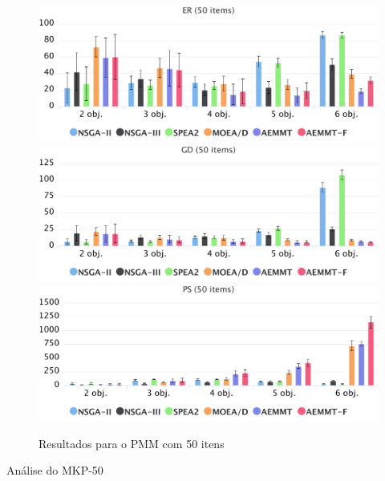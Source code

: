 \begin{figure}[!htbp]
	\caption{Resultados para o PMM com 50 itens}
	\label{fig_exp1_mkp_50}
	\includegraphics[width=1\textwidth]{cap_experimentos/figs/er-mkp-50}
	\includegraphics[width=1\textwidth]{cap_experimentos/figs/gd-mkp-50}
	\includegraphics[width=1\textwidth]{cap_experimentos/figs/ps-mkp-50}
\end{figure}

Análise do MKP-50

